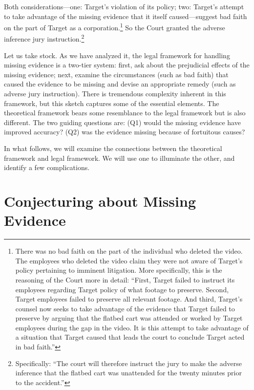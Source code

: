 \documentclass[
  10pt,
  dvipsnames,enabledeprecatedfontcommands]{scrartcl}
\begin{document}
\noindent Both considerations---one: Target's violation of its policy;
two: Target's attempt to take advantage of the missing evidence that it
itself caused---suggest bad faith on the part of Target as a
corporation.\footnote{There was no bad faith on the part of the
  individual who deleted the video. The employees who deleted the video
  claim they were not aware of Target's policy pertaining to imminent
  litigation. More specifically, this is the reasoning of the Court more
  in detail: ``First, Target failed to instruct its employees regarding
  Target policy of what footage to preserve. Second, Target employees
  failed to preserve all relevant footage. And third, Target's counsel
  now seeks to take advantage of the evidence that Target failed to
  preserve by arguing that the flatbed cart was attended or worked by
  Target employees during the gap in the video. It is this attempt to
  take advantage of a situation that Target caused that leads the court
  to conclude Target acted in bad faith.''} So the Court granted the
adverse inference jury instruction.\footnote{ Specifically: ``The court
  will therefore instruct the jury to make the adverse inference that
  the flatbed cart was unattended for the twenty minutes prior to the
  accident.''}

\vspace{4mm}

\noindent Let us take stock. As we have analyzed it, the legal framework
for handling missing evidence is a two-tier system: first, ask about the
prejudicial effects of the missing evidence; next, examine the
circumstances (such as bad faith) that caused the evidence to be missing
and devise an appropriate remedy (such as adverse jury instruction).
There is tremendous complexity inherent in this framework, but this
sketch captures some of the essential elements. The theoretical
framework bears some resemblance to the legal framework but is also
different. The two guiding questions are: (Q1) would the missing
evidence have improved accuracy? (Q2) was the evidence missing because
of fortuitous
causes?

In what follows, we will examine the connections between the theoretical
framework and legal framework. We will use one to illuminate the other,
and identify a few complications.

\hypertarget{conjecturing-about-missing-evidence}{%
\section{Conjecturing about Missing
Evidence}\label{conjecturing-about-missing-evidence}}
\end{document}
